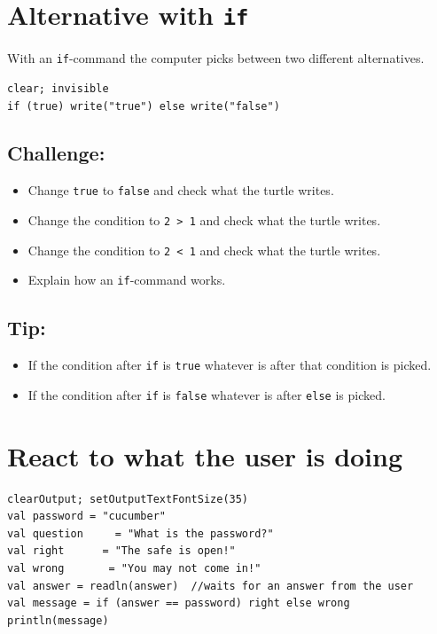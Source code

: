 \chapter{Alternative with \lstinline{if}}With an \lstinline{if}-command the computer picks between two different alternatives.

\begin{lstlisting}[basicstyle={\ttfamily\fontsize{20}{24}\selectfont},numbers=none]
clear; invisible
if (true) write("true") else write("false")
\end{lstlisting}
        
\section*{\color{BrickRed}Challenge:}


\begin{itemize}

\item {Change \lstinline{true} to \lstinline{false} and check what the turtle writes.}
\item {Change the condition to \lstinline{2 > 1} and check what the turtle writes.}
\item {Change the condition to \lstinline{2 < 1} and check what the turtle writes.}
\item {Explain how an \lstinline{if}-command works.}

\end{itemize}


\section*{\color{OliveGreen}Tip:}


\begin{itemize}

\item {If the condition after  \lstinline{if} is \lstinline{true} whatever is after that condition is picked.}
\item {If the condition after  \lstinline{if} is \lstinline{false} whatever is after \lstinline{else} is picked.}

\end{itemize}


\chapter{React to what the user is doing}
\begin{lstlisting}[basicstyle={\ttfamily\fontsize{20}{24}\selectfont},numbers=none]
clearOutput; setOutputTextFontSize(35)
val password = "cucumber"
val question     = "What is the password?"
val right      = "The safe is open!"
val wrong       = "You may not come in!"
val answer = readln(answer)  //waits for an answer from the user
val message = if (answer == password) right else wrong
println(message)
\end{lstlisting}
        
